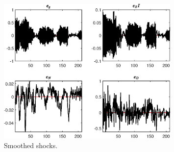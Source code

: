  
\begin{figure}[H]
\centering 
\includegraphics[width=0.80\textwidth]{BRS_growth_ext_shopping/graphs/BRS_growth_ext_shopping_SmoothedShocks1}
\caption{Smoothed shocks.}\label{Fig:SmoothedShocks:1}
\end{figure}



